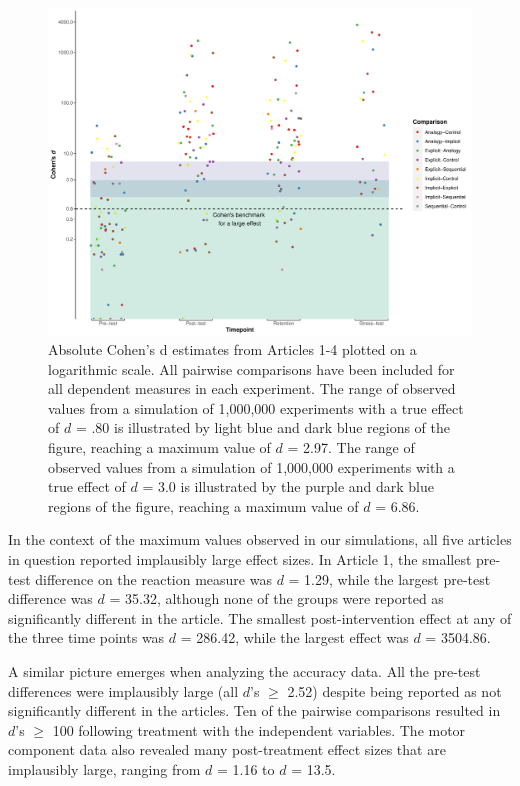 \documentclass[
  english,
  man,floatsintext]{apa7}
\begin{document}
\begin{figure}

{\centering \includegraphics[width=1\linewidth,height=1\textheight]{../../figs/fig1} 

}

\caption{Absolute Cohen's d estimates from Articles 1-4 plotted on a logarithmic scale. All pairwise comparisons have been included for all dependent measures in each experiment. The range of observed values from a simulation of 1,000,000 experiments with a true effect of \(d\) = .80 is illustrated by light blue and dark blue regions of the figure, reaching a maximum value of \(d\) = 2.97. The range of observed values from a simulation of 1,000,000 experiments with a true effect of \(d\) = 3.0 is illustrated by the purple and dark blue regions of the figure, reaching a maximum value of \(d\) = 6.86.}\label{fig:fig1}
\end{figure}

In the context of the maximum values observed in our simulations, all five articles in question reported implausibly large effect sizes. In Article 1, the smallest pre-test difference on the reaction measure was \(d\) = 1.29, while the largest pre-test difference was \(d\) = 35.32, although none of the groups were reported as significantly different in the article. The smallest post-intervention effect at any of the three time points was \(d\) = 286.42, while the largest effect was \(d\) = 3504.86.

A similar picture emerges when analyzing the accuracy data. All the pre-test differences were implausibly large (all \(d\)'s \(\geq\) 2.52) despite being reported as not significantly different in the articles. Ten of the pairwise comparisons resulted in \(d\)'s \(\geq\) 100 following treatment with the independent variables. The motor component data also revealed many post-treatment effect sizes that are implausibly large, ranging from \(d\) = 1.16 to \(d\) = 13.5.
\end{document}
